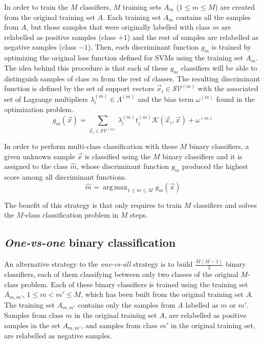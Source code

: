 \documentclass[10pt,a4paper]{article}
\DeclareMathOperator*{\argmax}{arg\,max}
\begin{document}
In order to train the $M$ classifiers, $M$ training sets $A_m$ ($1 \leq m \leq M$) are created from the original training set $A$. Each training set $A_m$ contains all the samples from $A$, but those samples that were originally labelled with class $m$ are relabelled as positive samples (class $+1$) and the rest of samples are relabelled as negative samples (class $-1$). Then, each discriminant function $g_m$ is trained by optimizing the original loss function defined for SVMs using the training set $A_m$. The idea behind this procedure is that each of these $g_m$ classifiers will be able to distinguish samples of class $m$ from the rest of classes. The resulting discriminant function is defined by the set of support vectors $\vec{x}_i \in \mathcal{SV}^{(m)}$ with the associated set of Lagrange multipliers $\lambda_i^{(m)} \in \Lambda^{(m)}$ and the bias term $\omega^{(m)}$ found in the optimization problem.\\

\begin{equation}
g_m(\vec{x}) = \sum_{\vec{x}_i \in \mathcal{SV}^{(m)}} \lambda_i^{(m)} t_i^{(m)} \mathcal{K}(\vec{x}_i, \vec{x}) + \omega^{(m)}
\end{equation}

In order to perform multi-class classification with these $M$ binary classifiers, a given unknown sample $\vec{x}$ is classified using the $M$ binary classifiers and it is assigned to the class $\hat{m}$, whose discriminant function $g_{\hat{m}}$ produced the highest score among all discriminant functions.\\

\begin{equation}
\hat{m} = \argmax_{1\leq m \leq M} g_m(\vec{x})
\end{equation}

The benefit of this strategy is that only requires to train $M$ classifiers and solves the $M$-class classification problem in $M$ steps.

\subsection{\emph{One-vs-one} binary classification}
An alternative strategy to the \emph{one-vs-all} strategy is to build $\frac{M (M-1)}{2}$ binary classifiers, each of them classifying between only two classes of the original $M$-class problem.
Each of these binary classifiers is trained using the training set $A_{m,m'}$, $1 \leq m < m' \leq M$, which has been built from the original training set $A$. The training set $A_{m,m'}$ contains only the samples from $A$ labelled as $m$ or $m'$. Samples from class $m$ in the original training set $A$, are relabelled as positive samples in the set $A_{m,m'}$, and samples from class $m'$ in the original training set, are relabelled as negative samples.\\
\end{document}
